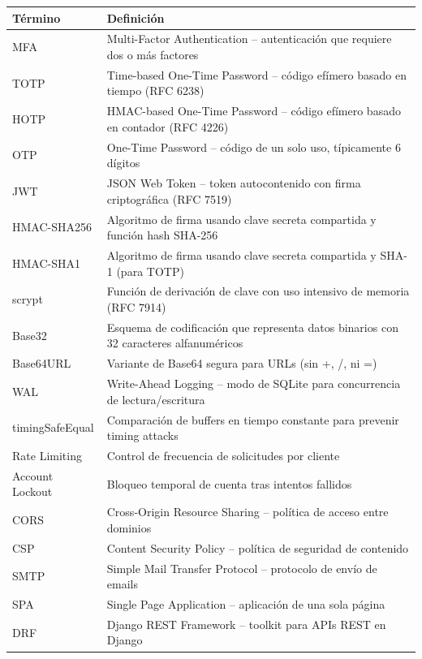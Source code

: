 \documentclass[12pt,a4paper,openany]{article}
\begin{document}
\begin{table}[H]
\centering
\begin{tabular}{@{}p{3.5cm}p{10cm}@{}}
\toprule
\textbf{Término} & \textbf{Definición} \\
\midrule
MFA & Multi-Factor Authentication -- autenticación que requiere dos o más factores \\
TOTP & Time-based One-Time Password -- código efímero basado en tiempo (RFC 6238) \\
HOTP & HMAC-based One-Time Password -- código efímero basado en contador (RFC 4226) \\
OTP & One-Time Password -- código de un solo uso, típicamente 6 dígitos \\
JWT & JSON Web Token -- token autocontenido con firma criptográfica (RFC 7519) \\
HMAC-SHA256 & Algoritmo de firma usando clave secreta compartida y función hash SHA-256 \\
HMAC-SHA1 & Algoritmo de firma usando clave secreta compartida y SHA-1 (para TOTP) \\
scrypt & Función de derivación de clave con uso intensivo de memoria (RFC 7914) \\
Base32 & Esquema de codificación que representa datos binarios con 32 caracteres alfanuméricos \\
Base64URL & Variante de Base64 segura para URLs (sin +, /, ni =) \\
WAL & Write-Ahead Logging -- modo de SQLite para concurrencia de lectura/escritura \\
timingSafeEqual & Comparación de buffers en tiempo constante para prevenir timing attacks \\
Rate Limiting & Control de frecuencia de solicitudes por cliente \\
Account Lockout & Bloqueo temporal de cuenta tras intentos fallidos \\
CORS & Cross-Origin Resource Sharing -- política de acceso entre dominios \\
CSP & Content Security Policy -- política de seguridad de contenido \\
SMTP & Simple Mail Transfer Protocol -- protocolo de envío de emails \\
SPA & Single Page Application -- aplicación de una sola página \\
DRF & Django REST Framework -- toolkit para APIs REST en Django \\
\bottomrule
\end{tabular}
\end{table}
\end{document}
